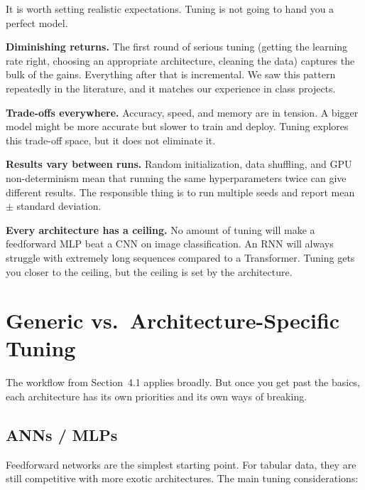 \documentclass[12pt, letterpaper]{article}
\begin{document}
It is worth setting realistic expectations. Tuning is not going to hand you a perfect model.

\textbf{Diminishing returns.} The first round of serious tuning (getting the learning rate right, choosing an appropriate architecture, cleaning the data) captures the bulk of the gains. Everything after that is incremental. We saw this pattern repeatedly in the literature, and it matches our experience in class projects.

\textbf{Trade-offs everywhere.} Accuracy, speed, and memory are in tension. A bigger model might be more accurate but slower to train and deploy. Tuning explores this trade-off space, but it does not eliminate it.

\textbf{Results vary between runs.} Random initialization, data shuffling, and GPU non-determinism mean that running the same hyperparameters twice can give different results. The responsible thing is to run multiple seeds and report mean $\pm$ standard deviation.

\textbf{Every architecture has a ceiling.} No amount of tuning will make a feedforward MLP beat a CNN on image classification. An RNN will always struggle with extremely long sequences compared to a Transformer. Tuning gets you closer to the ceiling, but the ceiling is set by the architecture.

\section{Generic vs.\ Architecture-Specific Tuning}

The workflow from Section~4.1 applies broadly. But once you get past the basics, each architecture has its own priorities and its own ways of breaking.

\subsection{ANNs / MLPs}

Feedforward networks are the simplest starting point. For tabular data, they are still competitive with more exotic architectures. The main tuning considerations:
\end{document}
